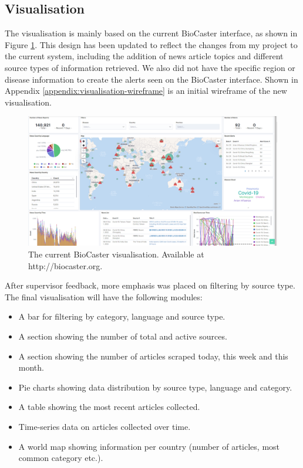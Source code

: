 \documentclass{l4proj}
\begin{document}
\subsection{Visualisation}
The visualisation is mainly based on the current BioCaster interface, as shown in Figure \ref{fig:biocaster-visualisation}. This design has been updated to reflect the changes from my project to the current system, including the addition of news article topics and different source types of information retrieved. We also did not have the specific region or disease information to create the alerts seen on the BioCaster interface. Shown in Appendix \ref{appendix:visualisation-wireframe} is an initial wireframe of the new visualisation. \par

 \begin{figure}[h]
\centering
\includegraphics[width=\textwidth]{images/biocaster_interface.png}
\caption{The current BioCaster visualisation. Available at http://biocaster.org.}
\label{fig:biocaster-visualisation}
\end{figure}


After supervisor feedback, more emphasis was placed on filtering by source type. The final visualisation will have the following modules:
\begin{itemize}
    \item A bar for filtering by category, language and source type.
    \item A section showing the number of total and active sources.
    \item A section showing the number of articles scraped today, this week and this month.
    \item Pie charts showing data distribution by source type, language and category.
    \item A table showing the most recent articles collected.
    \item Time-series data on articles collected over time.
    \item A world map showing information per country (number of articles, most common category etc.).
\end{itemize}
\end{document}

